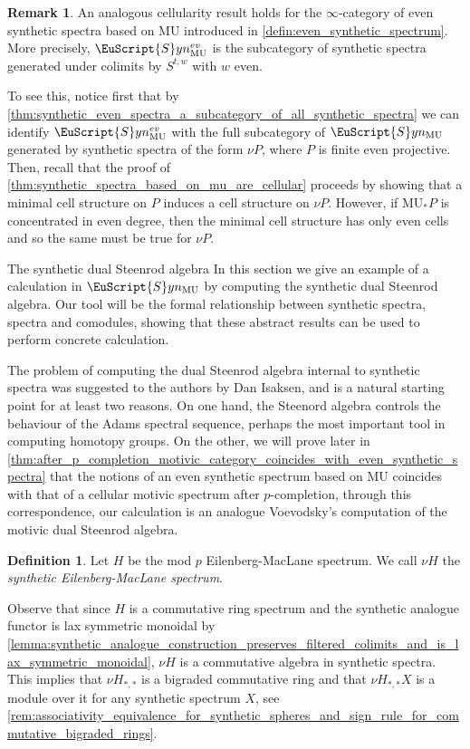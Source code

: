 \documentclass[oneside,a4paper]{amsart}
\makeatletter
\newcommand{\euscr}[1]{\EuScript{#1}} %
\newcommand{\MU}{\mathrm{MU}} %
\newcommand{\synspectra}{\euscr{S}yn} %
\theoremstyle{plain}
\theoremstyle{definition}
\newtheorem{defin}[thm]{Definition}
\newtheorem{rem}[thm]{Remark}
\theoremstyle{remark}
\def\subsection{\@startsection{subsection}{1}%
  \z@{.7\linespacing\@plus\linespacing}{.5\linespacing}%
  {\normalfont\bfseries\centering}}%
\makeatother
\begin{document}
\begin{rem}
\label{rem:even_synthetic_spectra_based_on_mu_generated_by_even_weight_spheres}
An analogous cellularity result holds for the $\infty$-category of even synthetic spectra based on $\MU$ introduced in \cref{defin:even_synthetic_spectrum}. More precisely, $\synspectra_{\MU}^{ev}$ is the subcategory of synthetic spectra generated under colimits by $S^{t, w}$ with $w$ even. 

To see this, notice first that by \cref{thm:synthetic_even_spectra_a_subcategory_of_all_synthetic_spectra} we can identify $\synspectra_{\MU}^{ev}$  with the full subcategory of $\synspectra_{\MU}$ generated by synthetic spectra of the form $\nu P$, where $P$ is finite even projective. Then, recall that the proof of \cref{thm:synthetic_spectra_based_on_mu_are_cellular} proceeds by showing that a minimal cell structure on $P$ induces a cell structure on $\nu P$. However, if $\MU_{*}P$ is concentrated in even degree, then the minimal cell structure has only even cells and so the same must be true for $\nu P$. 
\end{rem}

\subsection{The synthetic dual Steenrod algebra}
In this section we give an example of a calculation in $\synspectra_{\MU}$ by computing the synthetic dual Steenrod algebra. Our tool will be the formal relationship between synthetic spectra, spectra and comodules, showing that these abstract results can be used to perform concrete calculation. 

The problem of computing the dual Steenrod algebra internal to synthetic spectra was suggested to the authors by Dan Isaksen, and is a natural starting point for at least two reasons. On one hand, the Steenord algebra controls the behaviour of the Adams spectral sequence, perhaps the most important tool in computing homotopy groups. On the other, we will prove later in \cref{thm:after_p_completion_motivic_category_coincides_with_even_synthetic_spectra} that the notions of an even synthetic spectrum based on $\MU$ coincides with that of a cellular motivic spectrum after $p$-completion, through this correspondence, our calculation is an analogue Voevodsky's computation of the motivic dual Steenrod algebra. 

\begin{defin}
Let $H$ be the mod $p$ Eilenberg-MacLane spectrum. We call $\nu H$ the \emph{synthetic Eilenberg-MacLane spectrum}. 
\end{defin}
Observe that since $H$ is a commutative ring spectrum and the synthetic analogue functor is lax symmetric monoidal by \cref{lemma:synthetic_analogue_construction_preserves_filtered_colimits_and_is_lax_symmetric_monoidal}, $\nu H$ is a commutative algebra in synthetic spectra. This implies that $\nu H_{*, *}$ is a bigraded commutative ring and that $\nu H _{*, *} X$ is a module over it for any synthetic spectrum $X$, see \cref{rem:associativity_equivalence_for_synthetic_spheres_and_sign_rule_for_commutative_bigraded_rings}.
 
\end{document}
